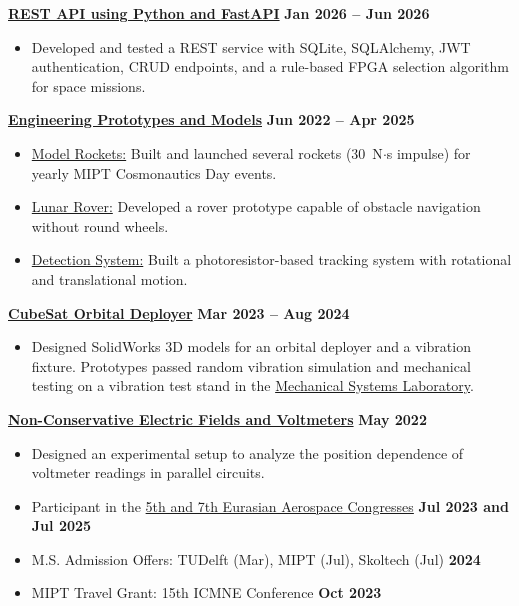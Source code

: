 \noindent \href{https://github.com/rezaaliasgarirenani/fastapi_phystech_fpga}{\textbf{REST API using Python and FastAPI}} \hfill \textbf{Jan 2026 -- Jun 2026}
\begin{itemize}
    \item Developed and tested a REST service with SQLite, SQLAlchemy, JWT authentication, CRUD endpoints, and a rule-based FPGA selection algorithm for space missions.
\end{itemize}
\noindent \href{https://github.com/rezaaliasgarirenani/engineering_projects}{\textbf{Engineering Prototypes and Models}} \hfill \textbf{Jun 2022 -- Apr 2025}
\begin{itemize}
    \item \href{https://github.com/icarus-imperium/}{Model Rockets:} Built and launched several rockets (30~N$\cdot$s impulse) for yearly MIPT Cosmonautics Day events.
    \item \href{https://github.com/rezaaliasgarirenani/engineering_projects/tree/main/rover}{Lunar Rover:} Developed a rover prototype capable of obstacle navigation without round wheels.
    \item \href{https://github.com/rezaaliasgarirenani/engineering_projects/tree/main/aircraft_detection_system}{Detection System:} Built a photoresistor-based tracking system with rotational and translational motion.
\end{itemize}
\noindent \href{https://github.com/rezaaliasgarirenani/cubesat_deployer}{\textbf{CubeSat Orbital Deployer}} \hfill \textbf{Mar 2023 -- Aug 2024}
\begin{itemize}
    \item Designed SolidWorks 3D models for an orbital deployer and a vibration fixture. Prototypes passed random vibration simulation and mechanical testing on a vibration test stand in the \href{https://mipt.ru/science/labs/laboratoriya-modelirovaniya-mekhanicheskikh-sistem-i-protsessov}{Mechanical Systems Laboratory}.
\end{itemize}

\noindent \href{https://github.com/rezaaliasgarirenani/phystech_academics/tree/main/non-conservative-electric-fields-and-voltmeters}{\textbf{Non-Conservative Electric Fields and Voltmeters}} \hfill \textbf{May 2022}
\begin{itemize}
    \item Designed an experimental setup to analyze the position dependence of voltmeter readings in parallel circuits.
\end{itemize}

\begin{itemize}[topsep=0cm, partopsep=0cm]
    \item{Participant in the \href{https://congress.aero/en/}{5th and 7th Eurasian Aerospace Congresses}} \hfill \textbf{Jul 2023 and Jul 2025}
    \item M.S. Admission Offers: TUDelft (Mar), MIPT (Jul), Skoltech (Jul) \hfill \textbf{2024}
    \item MIPT Travel Grant: 15th ICMNE Conference \hfill \textbf{Oct 2023}
\end{itemize}
